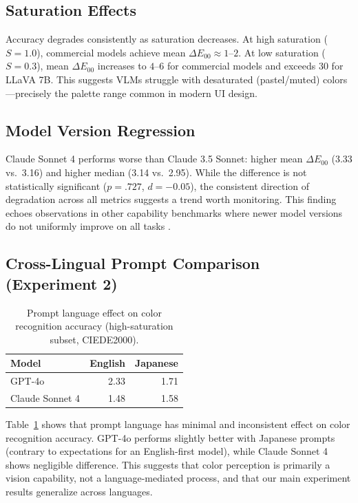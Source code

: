 \documentclass[11pt,a4paper]{article}
\begin{document}
\subsection{Saturation Effects}

Accuracy degrades consistently as saturation decreases. At high saturation ($S=1.0$), commercial models achieve mean $\Delta E_{00} \approx 1$--$2$. At low saturation ($S=0.3$), mean $\Delta E_{00}$ increases to $4$--$6$ for commercial models and exceeds $30$ for LLaVA 7B. This suggests VLMs struggle with desaturated (pastel/muted) colors---precisely the palette range common in modern UI design.

\subsection{Model Version Regression}

Claude Sonnet 4 performs worse than Claude 3.5 Sonnet: higher mean $\Delta E_{00}$ (3.33 vs.\ 3.16) and higher median (3.14 vs.\ 2.95). While the difference is not statistically significant ($p = .727$, $d = -0.05$), the consistent direction of degradation across all metrics suggests a trend worth monitoring. This finding echoes observations in other capability benchmarks where newer model versions do not uniformly improve on all tasks \cite{chen2023}.

\subsection{Cross-Lingual Prompt Comparison (Experiment 2)}

\begin{table}[H]
\centering
\caption{Prompt language effect on color recognition accuracy (high-saturation subset, CIEDE2000).}
\label{tab:prompt_lang}
\begin{tabular}{lrr}
\toprule
\textbf{Model} & \textbf{English} & \textbf{Japanese} \\
\midrule
GPT-4o & 2.33 & 1.71 \\
Claude Sonnet 4 & 1.48 & 1.58 \\
\bottomrule
\end{tabular}
\end{table}

Table~\ref{tab:prompt_lang} shows that prompt language has minimal and inconsistent effect on color recognition accuracy. GPT-4o performs slightly better with Japanese prompts (contrary to expectations for an English-first model), while Claude Sonnet 4 shows negligible difference. This suggests that color perception is primarily a vision capability, not a language-mediated process, and that our main experiment results generalize across languages.
\end{document}
